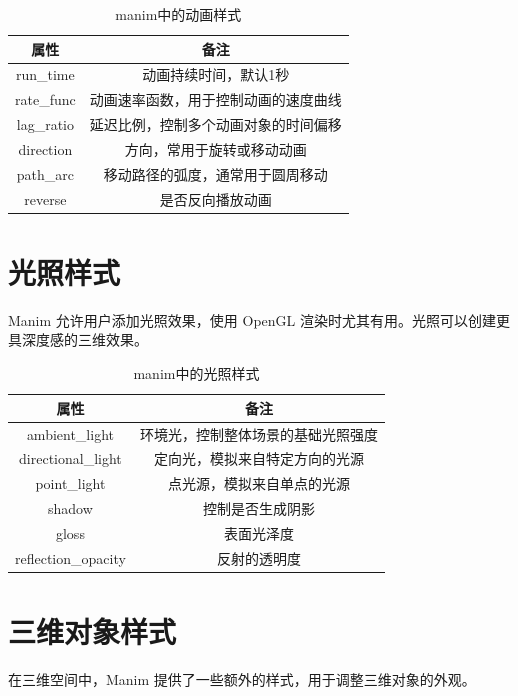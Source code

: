 \begin{table}[htpb]
\begin{tabular}{c|c}
属性              & 备注                            \\ \hline
run\_time         & 动画持续时间，默认1秒               \\
rate\_func        & 动画速率函数，用于控制动画的速度曲线 \\
lag\_ratio        & 延迟比例，控制多个动画对象的时间偏移  \\
direction         & 方向，常用于旋转或移动动画         \\
path\_arc         & 移动路径的弧度，通常用于圆周移动     \\
reverse           & 是否反向播放动画                  \\
\end{tabular}
\caption{manim中的动画样式}
\label{tab:manim中的动画样式}
\end{table}

\section{光照样式}
\label{sec:manim_animation_light}
Manim 允许用户添加光照效果，使用 OpenGL 渲染时尤其有用。光照可以创建更具深度感的三维效果。

\begin{table}[htpb]
\begin{tabular}{c|c}
属性                  & 备注                                \\ \hline
ambient\_light         & 环境光，控制整体场景的基础光照强度         \\
directional\_light     & 定向光，模拟来自特定方向的光源           \\
point\_light           & 点光源，模拟来自单点的光源              \\
shadow                 & 控制是否生成阴影                     \\
gloss                  & 表面光泽度                          \\
reflection\_opacity    & 反射的透明度                         \\
\end{tabular}
\caption{manim中的光照样式}
\label{tab:manim中的光照样式}
\end{table}

\section{三维对象样式}
\label{sec:manim_animation_3d}
在三维空间中，Manim 提供了一些额外的样式，用于调整三维对象的外观。

